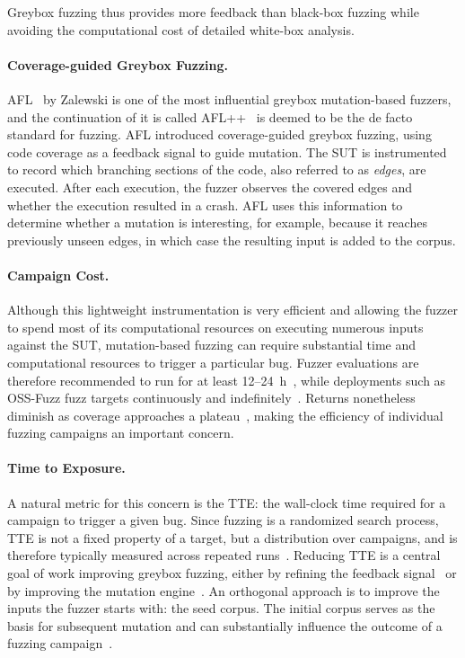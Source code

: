 Greybox fuzzing thus provides more feedback than black-box fuzzing while
avoiding the computational cost of detailed white-box analysis.

\paragraph{Coverage-guided Greybox Fuzzing.}
AFL~\cite{zalewski2017american} by Zalewski is one of the most influential greybox
mutation-based fuzzers, and the continuation of it is called
AFL++~\cite{fioraldiAFLCombiningIncremental2020} is deemed to be the de facto standard for fuzzing. AFL introduced coverage-guided
greybox fuzzing, using code coverage as a feedback signal to guide mutation. The
\ac{SUT} is instrumented to record which branching sections of the code, also
referred to as \emph{edges}, are executed. After each execution, the fuzzer
observes the covered edges and whether the execution resulted in a crash. AFL
uses this information to determine whether a mutation is interesting, for
example, because it reaches previously unseen edges, in which case the resulting
input is added to the corpus.

\paragraph{Campaign Cost.}
Although this lightweight instrumentation is very efficient and
allowing the fuzzer to spend most of its computational resources on executing
numerous inputs against the \ac{SUT}, mutation-based fuzzing can
require substantial time and computational resources to trigger a particular
bug. Fuzzer evaluations are therefore recommended to run for at least
12--24~h~\cite{klees2018, bohmeReliabilityCoveragebasedFuzzer2022, schloegelSoKPrudentEvaluation2024},
while deployments such as OSS-Fuzz fuzz targets continuously and
indefinitely~\cite{serebryanyOSSFuzzGooglesContinuous2017}. Returns nonetheless
diminish as coverage approaches a plateau~\cite{dingEmpiricalStudyOSSFuzz2021},
making the efficiency of individual fuzzing campaigns an important concern.

\paragraph{Time to Exposure.}
A natural metric for this concern is the \acf{TTE}: the wall-clock time required
for a campaign to trigger a given bug. Since fuzzing is a randomized search
process, \ac{TTE} is not a fixed property of a target, but a distribution over
campaigns, and is therefore typically measured across repeated
runs~\cite{klees2018}. Reducing \ac{TTE} is a central goal
of work improving greybox fuzzing, either by refining the feedback
signal~\cite{ganCollAFLPathSensitive2018,bohmeBoostingFuzzerEfficiency2020} or by
improving the mutation engine~\cite{lyuMOPTOptimizedMutation2019,
aschermannREDQUEENFuzzingInputtoState2019}. An orthogonal approach is to improve
the inputs the fuzzer starts with: the seed corpus. The initial corpus serves as
the basis for subsequent mutation and can substantially influence the outcome of
a fuzzing campaign~\cite{klees2018,
herreraSeedSelectionSuccessful2021}.

